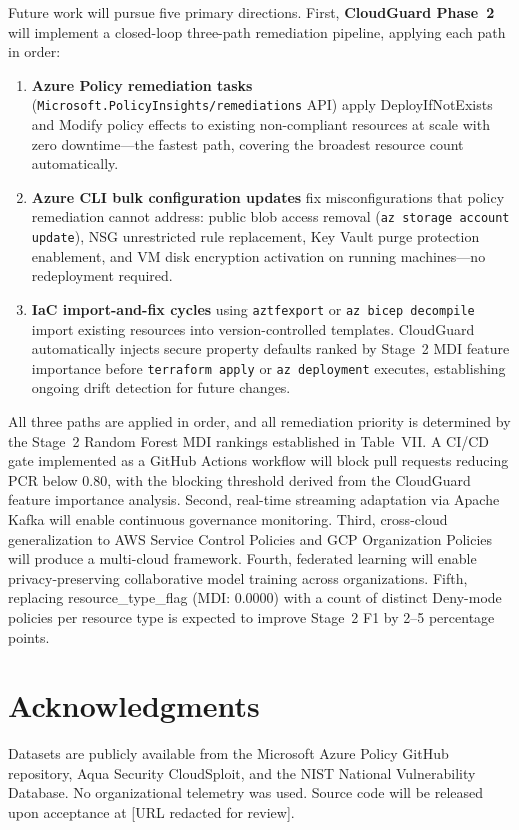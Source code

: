 \documentclass[conference]{IEEEtran}
\begin{document}
Future work will pursue five primary directions. First, 
\textbf{CloudGuard Phase~2} will implement a closed-loop three-path 
remediation pipeline, applying each path in order:
\begin{enumerate}
  \item \textbf{Azure Policy remediation tasks} 
  (\texttt{Microsoft.PolicyInsights/remediations} API) apply 
  DeployIfNotExists and Modify policy effects to existing non-compliant 
  resources at scale with zero downtime---the fastest path, covering 
  the broadest resource count automatically.
  \item \textbf{Azure CLI bulk configuration updates} fix 
  misconfigurations that policy remediation cannot address: public blob 
  access removal (\texttt{az storage account update}), NSG unrestricted 
  rule replacement, Key Vault purge protection enablement, and VM disk 
  encryption activation on running machines---no redeployment required.
  \item \textbf{IaC import-and-fix cycles} using \texttt{aztfexport} 
  or \texttt{az bicep decompile} import existing resources into 
  version-controlled templates. CloudGuard automatically injects secure 
  property defaults ranked by Stage~2 MDI feature importance before 
  \texttt{terraform apply} or \texttt{az deployment} executes, 
  establishing ongoing drift detection for future changes.
\end{enumerate}
All three paths are applied in order, and all remediation priority is 
determined by the Stage~2 Random Forest MDI rankings established in 
Table~VII. A CI/CD gate implemented as a GitHub Actions workflow will 
block pull requests reducing PCR below 0.80, with the blocking 
threshold derived from the CloudGuard feature importance analysis.
Second, real-time streaming adaptation via Apache Kafka will enable 
continuous governance monitoring. Third, cross-cloud generalization to 
AWS Service Control Policies and GCP Organization Policies will produce 
a multi-cloud framework. Fourth, federated learning will enable 
privacy-preserving collaborative model training across organizations. 
Fifth, replacing resource\_type\_flag (MDI: 0.0000) with a count of 
distinct Deny-mode policies per resource type is expected to improve 
Stage~2 F1 by 2--5 percentage points.

\section*{Acknowledgments}
Datasets are publicly available from the Microsoft Azure Policy GitHub 
repository, Aqua Security CloudSploit, and the NIST National 
Vulnerability Database. No organizational telemetry was used. Source 
code will be released upon acceptance at [URL redacted for review].



\end{document}
